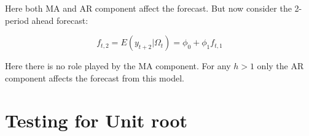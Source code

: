 \documentclass[]{book}
\theoremstyle{definition}
\theoremstyle{definition}
\theoremstyle{definition}
\theoremstyle{remark}
\begin{document}
Here both MA and AR component affect the forecast. But now consider the
2-period ahead forecast:

\[f_{t,2} = E(y_{t+2}|\Omega_t) = \phi_0 + \phi_1 f_{t,1}\]

Here there is no role played by the MA component. For any \(h>1\) only
the AR component affects the forecast from this model.

\hypertarget{testing-for-unit-root}{%
\section{Testing for Unit root}\label{testing-for-unit-root}}


\end{document}
